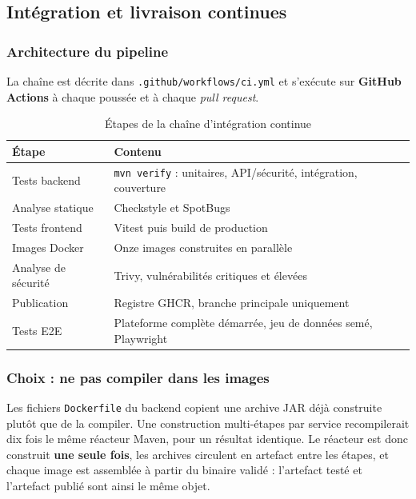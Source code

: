\subsection{Intégration et livraison continues}

\subsubsection{Architecture du pipeline}
La chaîne est décrite dans \texttt{.github/workflows/ci.yml} et s'exécute sur
\textbf{GitHub Actions} à chaque poussée et à chaque \emph{pull request}.

\begin{table}[H]\centering\renewcommand{\arraystretch}{1.25}
\begin{tabular}{|p{4cm}|p{9.5cm}|}\hline
\rowcolor{gray!15}\textbf{Étape} & \textbf{Contenu} \\ \hline
Tests backend & \texttt{mvn verify} : unitaires, API/sécurité, intégration, couverture \\ \hline
Analyse statique & Checkstyle et SpotBugs \\ \hline
Tests frontend & Vitest puis build de production \\ \hline
Images Docker & Onze images construites en parallèle \\ \hline
Analyse de sécurité & Trivy, vulnérabilités critiques et élevées \\ \hline
Publication & Registre GHCR, branche principale uniquement \\ \hline
Tests E2E & Plateforme complète démarrée, jeu de données semé, Playwright \\ \hline
\end{tabular}
\caption{Étapes de la chaîne d'intégration continue}\label{tab:pipeline}
\end{table}

\subsubsection{Choix : ne pas compiler dans les images}
Les fichiers \texttt{Dockerfile} du backend copient une archive JAR déjà construite plutôt
que de la compiler. Une construction multi-étapes par service recompilerait dix fois le même
réacteur Maven, pour un résultat identique. Le réacteur est donc construit \textbf{une
seule fois}, les archives circulent en artefact entre les étapes, et chaque image est
assemblée à partir du binaire validé : l'artefact testé et l'artefact publié sont ainsi le
même objet.


